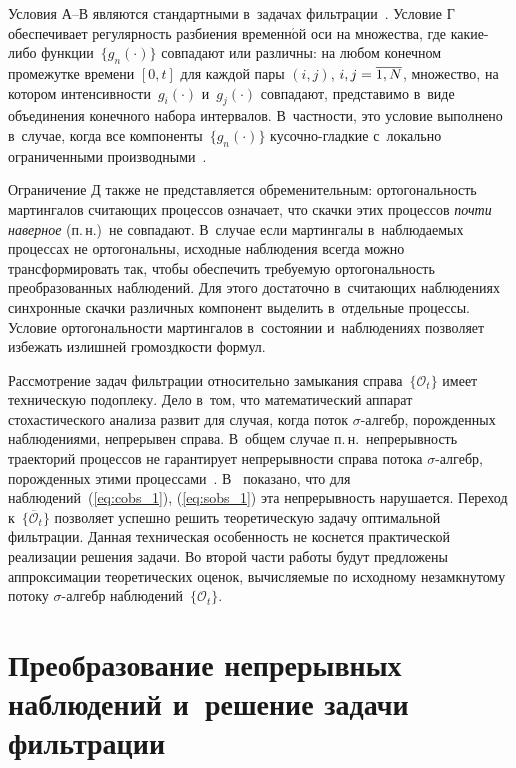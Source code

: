 \begin{multicols}{2}
Условия А--В являются стандартными в~задачах фильтрации~\cite{LSh_1_01, Kall_80, YZL_04}. 
Условие Г обеспечивает регулярность разбиения временн$\acute{\mbox{о}}$й оси на множества, где ка\-кие-ли\-бо 
функции~$\{g_n(\cdot)\}$ совпадают или различны: на любом конечном промежутке времени $[0,t]$ 
для каждой пары $(i,j)$, $i,j\hm=\overline{1,N}$, множество, на котором интенсивности~$g_i(\cdot)$ 
и~$g_j(\cdot)$ совпадают, представимо в~виде объединения конечного набора интервалов. 
В~частности, это условие выполнено в~случае, когда все компоненты~$\{g_n(\cdot)\}$ 
ку\-соч\-но-глад\-кие с~локально ограниченными производными~\cite{MN_2019}.

Ограничение Д также не представляется обременительным: ортогональность 
мартингалов считающих процессов означает, что скачки этих процессов \textit{почти наверное} (п.\,н.)\ 
не совпадают. В~случае если мартингалы в~наблюдаемых процессах не ортогональны, исходные наблюдения 
всегда можно трансформировать так, чтобы обеспечить тре\-бу\-емую ортогональность 
преобразованных наблюдений. Для этого достаточно в~считающих наблюдениях синхронные 
скачки различных компонент выделить в~отдельные процессы. Условие ортогональности 
мартингалов в~состоянии и~наблюдениях
позволяет избежать излишней громоздкости формул.

Рассмотрение задач фильтрации относительно замыкания справа~$\{\mathcal{O}_{t}\}$ имеет техническую подоплеку.
 Дело в~том, что математический аппарат стохастического анализа развит для случая, когда поток 
 $\sigma$-ал\-гебр, порожденных наблюдениями, непрерывен справа. В~общем случае п.\,н.\
  непрерывность траекторий процессов не гарантирует не\-пре\-рыв\-ности справа потока $\sigma$-ал\-гебр, 
  порожденных этими процессами~\cite{S_97}. В~\cite{BS_20} показано, что для наблюдений~(\ref{eq:cobs_1}), 
  (\ref{eq:sobs_1}) эта непрерывность нарушается. Переход к~$\{\overline{\mathcal{O}}_t\}$ 
  позволяет успешно решить теоретическую задачу оптимальной фильтрации. Данная 
  техническая особенность не коснется практической реализации решения задачи. 
  Во второй части работы будут предложены аппроксимации теоретических оценок, 
  вычисляемые по исходному незамкнутому потоку $\sigma$-ал\-гебр наблюдений~$\{\mathcal{O}_{t}\}$.

 \section{Преобразование непрерывных наблюдений и~решение задачи фильтрации}
 

\end{multicols}
